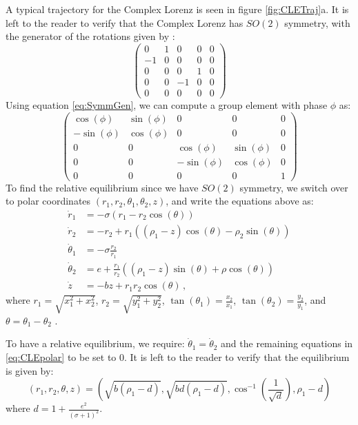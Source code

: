\documentclass[aip,cha,reprint,
secnumarabic,
nofootinbib, tightenlines,
nobibnotes, showkeys, showpacs,
groupedaddress
]{revtex4-1}
\begin{document}
A typical trajectory for the Complex Lorenz is seen in figure \ref{fig:CLETraj}a.  It is left to the reader to verify that the Complex Lorenz has $SO(2)$ symmetry, with the generator of the rotations given by \cite{CB}:
\[ \left( \begin{array}{ccccc}
0 & 1 & 0 & 0 & 0 \\
-1 & 0 & 0 & 0 & 0 \\
0 & 0 & 0 & 1 & 0\\
0 & 0 & -1 & 0 & 0 \\
0 & 0 & 0 & 0 & 0\end{array} \right)\]
Using equation \ref{eq:SymmGen}, we can compute a group element with phase $\phi$ as:
\begin{equation}
\left(
\begin{array}{ccccc}
\cos(\phi) & \sin(\phi) & 0 & 0 & 0 \\
-\sin(\phi) & \cos(\phi) & 0 & 0 & 0 \\
0 & 0 & \cos(\phi) & \sin(\phi) & 0\\
0 & 0 & -\sin(\phi) & \cos(\phi) & 0 \\
0 & 0 & 0 & 0 & 1
\end{array}\right)
\end{equation}
To find the relative equilibrium since we have $SO(2)$ symmetry, we switch over to polar coordinates $(r_1, r_2, \theta_1, \theta_2, z)$, and write the equations above as:
\begin{equation}
\begin{split}
  \dot r_1 &= -\sigma(r_1 - r_2\cos(\theta)) \\
  \dot r_2 &=   -r_2 + r_1((\rho_1 - z)\cos(\theta) - \rho_2\sin(\theta)) \\
  \dot \theta_1 &= -\sigma \frac{r_2}{r_1} \\
  \dot \theta_2 &= e + \frac{r_1}{r_2}((\rho_1 - z)\sin(\theta)+\rho\cos(\theta)) \\
  \dot z &= -bz  + r_1r_2\cos(\theta) \,,
    \label{eq:CLEpolar}
\end{split}
\end{equation}
where $r_1 = \sqrt{x_1^2 + x_2^2}$, $r_2 = \sqrt{y_1^2 + y_2^2}$, $\tan(\theta_1) = \frac{x_2}{x_1}$, $\tan(\theta_2) = \frac{y_2}{y_1}$, and $\theta = \theta_1-\theta_2$ \cite{CB}.

To have a relative equilibrium, we require: $\dot \theta_1 = \dot \theta_2$ and the remaining equations in \ref{eq:CLEpolar} to be set to $0$. It is left to the reader to verify that the equilibrium is given by:
\begin{equation}
(r_1, r_2, \theta, z) = (\sqrt{b(\rho_1-d)}, \sqrt{bd(\rho_1-d)}, \cos^{-1}(\frac{1}{\sqrt{d}}), \rho_1 - d)
\end{equation}
where $d = 1+ \frac{e^2}{(\sigma+1)^2}$.
\end{document}
